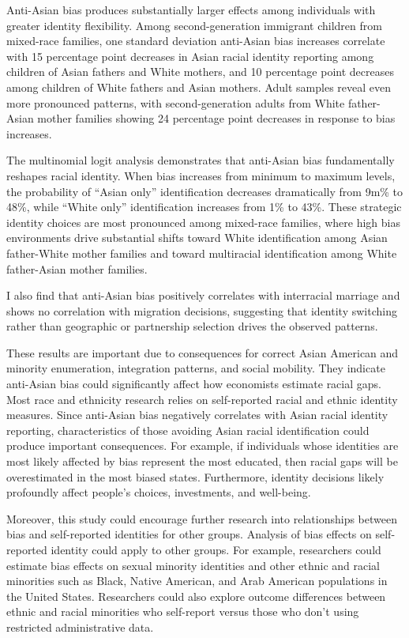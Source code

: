 Anti-Asian bias produces substantially larger effects among individuals with greater identity flexibility. Among second-generation immigrant children from mixed-race families, one standard deviation anti-Asian bias increases correlate with 15 percentage point decreases in Asian racial identity reporting among children of Asian fathers and White mothers, and 10 percentage point decreases among children of White fathers and Asian mothers. Adult samples reveal even more pronounced patterns, with second-generation adults from White father-Asian mother families showing 24 percentage point decreases in response to bias increases.

The multinomial logit analysis demonstrates that anti-Asian bias fundamentally reshapes racial identity. When bias increases from minimum to maximum levels, the probability of ``Asian only'' identification decreases dramatically from 9m\% to 48\%, while ``White only'' identification increases from 1\% to 43\%. These strategic identity choices are most pronounced among mixed-race families, where high bias environments drive substantial shifts toward White identification among Asian father-White mother families and toward multiracial identification among White father-Asian mother families.

I also find that anti-Asian bias positively correlates with interracial marriage and shows no correlation with migration decisions, suggesting that identity switching rather than geographic or partnership selection drives the observed patterns.

These results are important due to consequences for correct Asian American and minority enumeration, integration patterns, and social mobility. They indicate anti-Asian bias could significantly affect how economists estimate racial gaps. Most race and ethnicity research relies on self-reported racial and ethnic identity measures. Since anti-Asian bias negatively correlates with Asian racial identity reporting, characteristics of those avoiding Asian racial identification could produce important consequences. For example, if individuals whose identities are most likely affected by bias represent the most educated, then racial gaps will be overestimated in the most biased states. Furthermore, identity decisions likely profoundly affect people's choices, investments, and well-being.

Moreover, this study could encourage further research into relationships between bias and self-reported identities for other groups. Analysis of bias effects on self-reported identity could apply to other groups. For example, researchers could estimate bias effects on sexual minority identities and other ethnic and racial minorities such as Black, Native American, and Arab American populations in the United States. Researchers could also explore outcome differences between ethnic and racial minorities who self-report versus those who don't using restricted administrative data.


